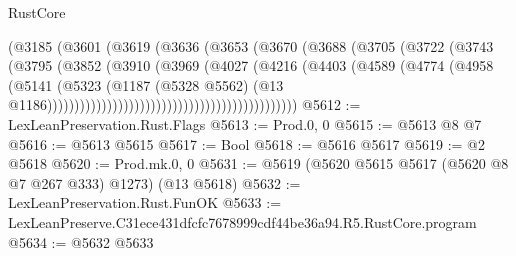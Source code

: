 \begin{lexlean}{RustCore}
\begin{coremodule}
                                                (@3185
                                                  (@3601
                                                    (@3619
                                                      (@3636
                                                        (@3653
                                                          (@3670
                                                            (@3688
                                                              (@3705
                                                                (@3722
                                                                  (@3743
                                                                    (@3795
                                                                      (@3852
                                                                        (@3910
                                                                          (@3969
                                                                            (@4027
                                                                              (@4216
                                                                                (@4403
                                                                                  (@4589
                                                                                    (@4774
                                                                                      (@4958
                                                                                        (@5141
                                                                                          (@5323
                                                                                            (@1187
                                                                                              (@5328
                                                                                                @5562)
                                                                                              (@13
                                                                                                @1186))))))))))))))))))))))))))))))))))))))))))))))
@5612 := LexLeanPreservation.Rust.Flags
@5613 := Prod.{0, 0}
@5615 := @5613 @8 @7
@5616 := @5613 @5615
@5617 := Bool
@5618 := @5616 @5617
@5619 := @2 @5618
@5620 := Prod.mk.{0, 0}
@5631 := @5619 (@5620 @5615 @5617 (@5620 @8 @7 @267 @333) @1273) (@13 @5618)
@5632 := LexLeanPreservation.Rust.FunOK
@5633 := LexLeanPreserve.C31ece431dfcfc7678999cdf44be36a94.R5.RustCore.program
@5634 := @5632 @5633

\end{coremodule}
\end{lexlean}

